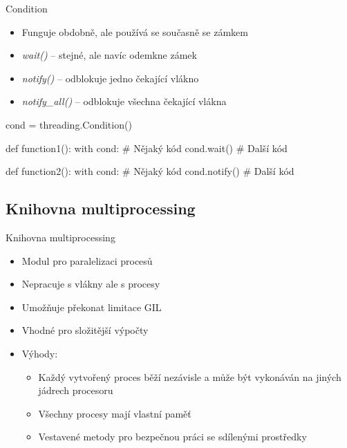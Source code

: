 \documentclass{beamer}
\begin{document}
\begin{frame}[fragile]{Condition}
    \begin{itemize}
        \item Funguje obdobně, ale používá se současně se zámkem

        \vskip 0.25in
        \item \textit{wait()} – stejné, ale navíc odemkne zámek
        \item \textit{notify()} – odblokuje jedno čekající vlákno
        \item \textit{notify\_all()} – odblokuje všechna čekající vlákna
    \end{itemize}
    \scriptsize
    \begin{semiverbatim}
    cond = threading.Condition()

    def function1():
    	with cond:
    		# Nějaký kód
    		cond.wait()
    		# Další kód
    
    def function2():
    	with cond:
    		# Nějaký kód
    		cond.notify()
    		# Další kód
    \end{semiverbatim}
\end{frame}

\subsection{Knihovna multiprocessing}
\begin{frame}{Knihovna multiprocessing}
    \begin{itemize}
        \item Modul pro paralelizaci procesů
        \item Nepracuje s vlákny ale s procesy
        \item Umožňuje překonat limitace GIL
        \item Vhodné pro složitější výpočty
        
        \vskip 0.3in
        \item Výhody:
        \begin{itemize}
            \item Každý vytvořený proces běží nezávisle a může být vykonáván na jiných jádrech procesoru
            \item Všechny procesy mají vlastní paměť
            \item Vestavené metody pro bezpečnou práci se sdílenými prostředky
        \end{itemize}
    \end{itemize}
\end{frame}
\end{document}
